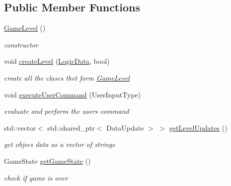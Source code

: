 \subsection*{Public Member Functions}
\begin{DoxyCompactItemize}
\item 
\mbox{\label{class_game_level_a5723a38b2b32300d4f071419afacd6f9}} 
\mbox{\hyperlink{class_game_level_a5723a38b2b32300d4f071419afacd6f9}{Game\+Level}} ()
\begin{DoxyCompactList}\small\item\em constructor \end{DoxyCompactList}\item 
\mbox{\label{class_game_level_acbabd989c2876a2326e6b69e33e75fa1}} 
void \mbox{\hyperlink{class_game_level_acbabd989c2876a2326e6b69e33e75fa1}{create\+Level}} (\mbox{\hyperlink{class_logic_data}{Logic\+Data}}, bool)
\begin{DoxyCompactList}\small\item\em create all the clases thet form \mbox{\hyperlink{class_game_level}{Game\+Level}} \end{DoxyCompactList}\item 
void \mbox{\hyperlink{class_game_level_a53cd899aa9aeaf3e9579ff32598b0043}{execute\+User\+Command}} (User\+Input\+Type)
\begin{DoxyCompactList}\small\item\em evaluate and perform the user\textquotesingle{}s command \end{DoxyCompactList}\item 
\mbox{\label{class_game_level_a89ddaa1423d19132e8d4c97b36f92895}} 
std\+::vector$<$ std\+::shared\+\_\+ptr$<$ Data\+Update $>$ $>$ \mbox{\hyperlink{class_game_level_a89ddaa1423d19132e8d4c97b36f92895}{get\+Level\+Updates}} ()
\begin{DoxyCompactList}\small\item\em get objec\textquotesingle{}s data as a vector of strings \end{DoxyCompactList}\item 
\mbox{\label{class_game_level_a907f82fea7462dbaf47c396cf65e2e89}} 
Game\+State \mbox{\hyperlink{class_game_level_a907f82fea7462dbaf47c396cf65e2e89}{get\+Game\+State}} ()
\begin{DoxyCompactList}\small\item\em check if game is over \end{DoxyCompactList}\end{DoxyCompactItemize}


